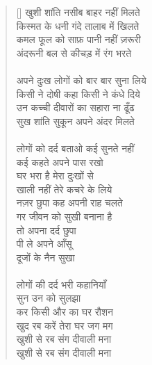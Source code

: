 \begin{verse}[\versewidth]\texthindi{
खुशी शांति नसीब बाहर नहीं मिलते\\
किस्मत के धनी गंदे तालाब में खिलते\\
कमल फूल को साफ़ पानी नहीं ज़रूरी\\
अंदरूनी बल से कीचड़ में रंग भरते\\
\\
अपने दुःख लोगों को बार बार सुना लिये\\
किसी ने दोषी कहा किसी ने कंधे दिये\\
उन कच्ची दीवारों का सहारा ना ढूँढ\\
सुख शांति सुकून अपने अंदर मिलते\\
\\
लोगों को दर्द बताओ कई सुनते नहीं\\
कई कहते अपने पास रखो\\
घर भरा है मेरा दुःखों से\\
खाली नहीं तेरे कचरे के लिये\\
नज़र छुपा कह अपनी राह चलते\\
गर जीवन को सुखी बनाना है\\
तो अपना दर्द छुपा\\
 पी ले अपने आँसू\\
दूजों के नैन सुखा\\
\\
लोगों की दर्द भरी कहानियाँ\\
सुन उन को सुलझा\\
कर किसी और का घर रौशन\\
खुद रब करें तेरा घर जग मग\\
खुशी से रब संग दीवाली मना\\
खुशी से रब संग दीवाली मना
}
\end{verse}

